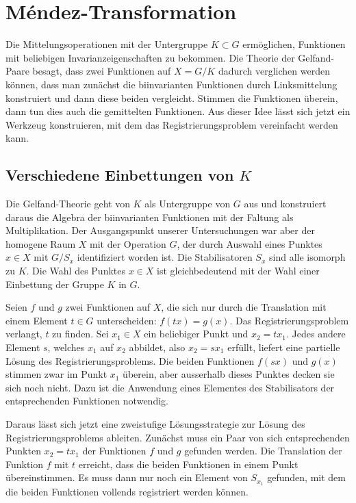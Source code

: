 %
%
%
\section{Méndez-Transformation
\label{buch:nichtkomm:section:mendez}}
Die Mittelungsoperationen mit der Untergruppe $K\subset G$ ermöglichen,
Funktionen mit beliebigen Invarianzeigenschaften zu bekommen.
Die Theorie der Gelfand-Paare besagt, dass zwei Funktionen auf $X=G/K$
dadurch verglichen werden können, dass man zunächst die biinvarianten
Funktionen durch Linksmittelung konstruiert und dann diese beiden
vergleicht.
Stimmen die Funktionen überein, dann tun dies auch die gemittelten
Funktionen.
Aus dieser Idee lässt sich jetzt ein Werkzeug konstruieren, mit dem
das Registrierungsproblem vereinfacht werden kann.

%
%
\subsection{Verschiedene Einbettungen von $K$}
Die Gelfand-Theorie geht von $K$ als Untergruppe von $G$ aus und
konstruiert daraus die Algebra der biinvarianten Funktionen mit
der Faltung als Multiplikation.
Der Ausgangspunkt unserer Untersuchungen war aber der homogene
Raum $X$ mit der Operation $G$, der durch Auswahl eines Punktes $x\in X$
mit $G/S_x$ identifiziert worden ist.
Die Stabilisatoren $S_x$ sind alle isomorph zu $K$.
Die Wahl des Punktes $x\in X$ ist gleichbedeutend mit der Wahl einer
Einbettung der Gruppe $K$ in $G$.

Seien $f$ und $g$ zwei Funktionen auf $X$, die sich nur durch die
Translation mit einem Element $t\in G$ unterscheiden: $f(tx) = g(x)$.
Das Registrierungsproblem verlangt, $t$ zu finden.
Sei $x_1\in X$ ein beliebiger Punkt und $x_2=tx_1$.
Jedes andere Element $s$, welches $x_1$ auf $x_2$ abbildet,
also $x_2=sx_1$ erfüllt, liefert eine partielle Lösung
des Registrierungsproblems.
Die beiden Funktionen $f(sx)$ und $g(x)$ stimmen zwar im Punkt $x_1$
überein, aber ausserhalb dieses Punktes decken sie sich noch nicht.
Dazu ist die Anwendung eines Elementes des Stabilisators der
entsprechenden Funktionen notwendig.

Daraus lässt sich jetzt eine zweistufige Lösungsstrategie zur
Lösung des Registrierungsproblems ableiten.
Zunächst muss ein Paar von sich entsprechenden Punkten $x_2=tx_1$
der Funktionen $f$ und $g$ gefunden werden.
Die Translation der Funktion $f$ mit $t$ erreicht, dass die
beiden Funktionen in einem Punkt übereinstimmen.
Es muss dann nur noch ein Element von $S_{x_1}$ gefunden, mit
dem die beiden Funktionen vollends registriert werden können.

